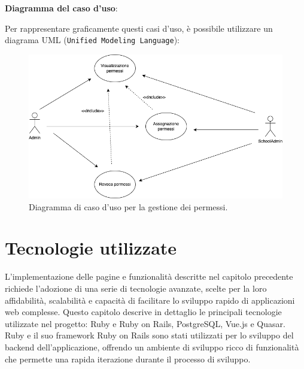 \documentclass[a4paper, 12pt]{book}
\begin{document}
\textbf{Diagramma del caso d'uso}:

Per rappresentare graficamente questi casi d'uso, è possibile utilizzare un diagrama UML (\texttt{Unified Modeling Language}):

\begin{figure}[H]
  \centering
  \includegraphics[width=\textwidth]{../images/diagramma-casi-uso-attori.png}
  \caption{Diagramma di caso d'uso per la gestione dei permessi.}
\end{figure}



\chapter{Tecnologie utilizzate}

\thispagestyle{empty}


L'implementazione delle pagine e funzionalità descritte nel capitolo precedente richiede l'adozione di una serie di tecnologie avanzate, scelte per la
loro affidabilità, scalabilità e capacità di facilitare lo sviluppo rapido di applicazioni web complesse. Questo capitolo descrive in dettaglio
le principali tecnologie utilizzate nel progetto: Ruby e Ruby on Rails, PostgreSQL, Vue.js e Quasar.\\

Ruby e il suo framework Ruby on Rails sono stati utilizzati per lo sviluppo del backend dell'applicazione, offrendo un ambiente di sviluppo
ricco di funzionalità che permette una rapida iterazione durante il processo di sviluppo.\\
\end{document}
